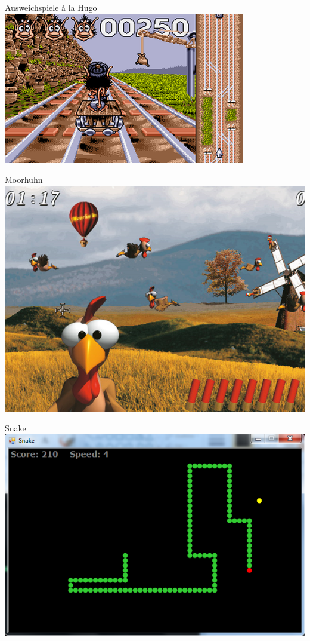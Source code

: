 \begin{minipage}{.45\textwidth}
	\begin{center}Ausweichspiele à la Hugo\\\vspace{4ex}\includegraphics[width=.4\textwidth]{figures/img_hugo.png}\end{center}
	\begin{center}Moorhuhn\\\vspace{4ex}\includegraphics[width=.4\textwidth]{figures/img_moorhuhn.png}\end{center}
	\begin{center}Snake\\\vspace{4ex}\includegraphics[width=.4\textwidth]{figures/img_snake.png}\end{center}
\end{minipage}



